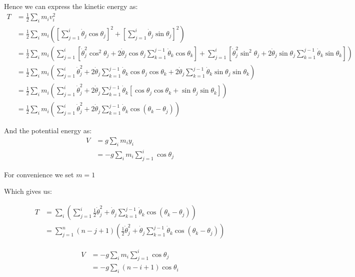 \documentclass{article}
\begin{document}
Hence we can express the kinetic energy as:
\begin{align}
T &= \frac{1}{2} \sum_{i} m_i v_i^2 \\ 
&= \frac{1}{2} \sum_i m_i \left( \left[ \sum_{j=1}^i \dot{\theta}_j \cos \theta_j \right]^2 + \left[ \sum_{j=1}^i  \dot{\theta}_j \sin \theta_j \right]^2 \right) \\
&= \frac{1}{2} \sum_i m_i \left( \sum_{j=1}^i \left[ \dot{\theta}_j^2 \cos^2 \theta_j + 2 \dot{\theta}_j \cos \theta_j \sum_{k = 1}^{j-1}  \dot{\theta}_k \cos\theta_k \right] + \sum_{j=1}^i \left[ \dot{\theta}_j^2 \sin^2 \theta_j + 2 \dot{\theta}_j \sin \theta_j \sum_{k =1}^{j-1}  \dot{\theta}_k \sin\theta_k  \right] \right) \\
&= \frac{1}{2} \sum_i m_i \left( \sum_{j=1}^i \dot{\theta}_j^2 + 2 \dot{\theta}_j \sum_{k =1 }^{j-1}  \dot{\theta}_k \cos \theta_j \cos\theta_k + 2 \dot{\theta}_j \sum_{k = 1}^{j-1}   \dot{\theta}_k \sin \theta_j  \sin\theta_k \right) \\
&= \frac{1}{2} \sum_i m_i \left( \sum_{j=1}^i \dot{\theta}_j^2 + 2 \dot{\theta}_j \sum_{k =1}^{j-1}  \dot{\theta}_k \left[\cos \theta_j \cos\theta_k + \sin \theta_j  \sin\theta_k \right] \right) \\
&= \frac{1}{2} \sum_i m_i \left( \sum_{j=1}^i \dot{\theta}_j^2 + 2 \dot{\theta}_j \sum_{k=1}^{j-1}  \dot{\theta}_k \cos(\theta_k-\theta_j) \right)
\end{align}

And the potential energy as:
\begin{align}
V &= g \sum_i m_i y_i \\
&= - g \sum_i m_i \sum_{j=1}^i \cos \theta_j
\end{align}

For convenience we set $m=1$

Which gives us:

\begin{align}
T &= \sum_i \left( \sum_{j=1}^i \frac{1}{2} \dot{\theta}_j^2 + \dot{\theta}_j \sum_{k=1}^{j-1}  \dot{\theta}_k \cos(\theta_k-\theta_j) \right) \\
&= \sum_{j=1}^n (n-j+1) \left( \frac{1}{2} \dot{\theta}_j^2 + \dot{\theta}_j \sum_{k=1}^{j-1}  \dot{\theta}_k \cos(\theta_k-\theta_j) \right)
\end{align}

\begin{align}
V &= - g \sum_i m_i \sum_{j=1}^i \cos \theta_j \\
&= - g \sum_i (n-i+1) \cos \theta_i
\end{align}
\end{document}
